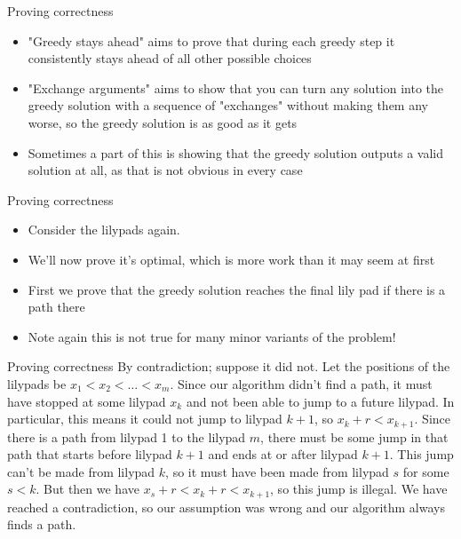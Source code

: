 \documentclass{beamer}
\begin{document}
\begin{frame}[plain]{Proving correctness}
    \begin{itemize}
        \item "Greedy stays ahead" aims to prove that during each greedy step it consistently stays ahead of all other possible choices
        \item "Exchange arguments" aims to show that you can turn any solution into the greedy solution with a sequence of "exchanges" without making them any worse, so the greedy solution is as good as it gets
        \item Sometimes a part of this is showing that the greedy solution outputs a valid solution at all, as that is not obvious in every case
    \end{itemize}
\end{frame}

\begin{frame}[plain]{Proving correctness}
    \begin{itemize}
        \item Consider the lilypads again.
        \item We'll now prove it's optimal, which is more work than it may seem at first
        \item First we prove that the greedy solution reaches the final lily pad if there is a path there
        \item Note again this is not true for many minor variants of the problem!
    \end{itemize}
\end{frame}

\begin{frame}[plain]{Proving correctness}
    By contradiction; suppose it did not. 
    Let the positions of the lilypads be $x_1 < x_2 < \dots < x_m$. 
    Since our algorithm didn't find a path, it must have stopped 
    at some lilypad $x_k$ and not been able to jump to a 
    future lilypad. In particular, this means it could not 
    jump to lilypad $k + 1$, so $x_k + r < x_{k+1}$.
	Since there is a path from lilypad 1 to the lilypad $m$, 
	there must be some jump in that path that starts
	before lilypad $k + 1$ and ends at or after lilypad $k + 1$.
	This jump can't be made from lilypad $k$, so it must
	have been made from lilypad $s$ for some $s < k$. But 
	then we have $x_s + r < x_k + r < x_{k+1}$, so this jump is illegal.
	We have reached a contradiction, so our assumption
	was wrong and our algorithm always finds a path.
\end{frame}
\end{document}

